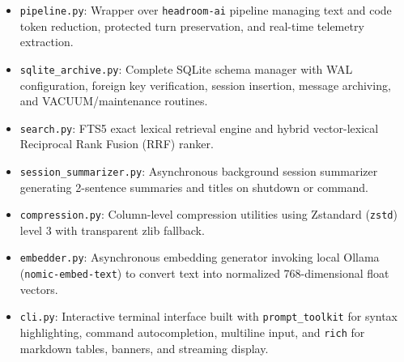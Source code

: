 \begin{description}
\begin{itemize}
    \end{itemize}
    \item[\texttt{ai\_assistant.compression}:]
    \begin{itemize}
        \item \texttt{pipeline.py}: Wrapper over \texttt{headroom-ai} pipeline managing text and code token reduction, protected turn preservation, and real-time telemetry extraction.
    \end{itemize}
    \item[\texttt{ai\_assistant.storage}:]
    \begin{itemize}
        \item \texttt{sqlite\_archive.py}: Complete SQLite schema manager with WAL configuration, foreign key verification, session insertion, message archiving, and VACUUM/maintenance routines.
        \item \texttt{search.py}: FTS5 exact lexical retrieval engine and hybrid vector-lexical Reciprocal Rank Fusion (RRF) ranker.
        \item \texttt{session\_summarizer.py}: Asynchronous background session summarizer generating 2-sentence summaries and titles on shutdown or command.
        \item \texttt{compression.py}: Column-level compression utilities using Zstandard (\texttt{zstd}) level 3 with transparent zlib fallback.
    \end{itemize}
    \item[\texttt{ai\_assistant.embeddings}:]
    \begin{itemize}
        \item \texttt{embedder.py}: Asynchronous embedding generator invoking local Ollama (\texttt{nomic-embed-text}) to convert text into normalized 768-dimensional float vectors.
    \end{itemize}
    \item[\texttt{ai\_assistant.ui}:]
    \begin{itemize}
        \item \texttt{cli.py}: Interactive terminal interface built with \texttt{prompt\_toolkit} for syntax highlighting, command autocompletion, multiline input, and \texttt{rich} for markdown tables, banners, and streaming display.
    \end{itemize}
\end{description}

